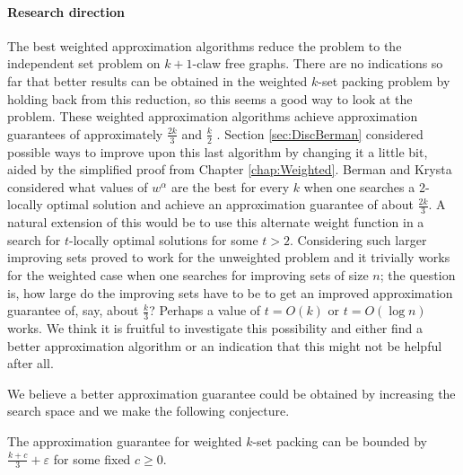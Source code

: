 \paragraph{Research direction} The best weighted approximation algorithms reduce the problem to the independent set problem on $k+1$-claw free graphs. There are no indications so far that better results can be obtained in the weighted $k$-set packing problem by holding back from this reduction, so this seems a good way to look at the problem. These weighted approximation algorithms achieve approximation guarantees of approximately $\frac{2k}{3}$ \cite{Chandra} and $\frac{k}{2}$ \cite{Berman}. Section \ref{sec:DiscBerman} considered possible ways to improve upon this last algorithm by changing it a little bit, aided by the simplified proof from Chapter \ref{chap:Weighted}. Berman and Krysta \cite{BermanWeighted2} considered what values of $w^\alpha$ are the best for every $k$ when one searches a 2-locally optimal solution and achieve an approximation guarantee of about $\frac{2k}{3}$. A natural extension of this would be to use this alternate weight function in a search for $t$-locally optimal solutions for some $t>2$. Considering such larger improving sets proved to work for the unweighted problem and it trivially works for the weighted case when one searches for improving sets of size $n$; the question is, how large do the improving sets have to be to get an improved approximation guarantee of, say, about $\frac{k}{3}$? Perhaps a value of $t = O(k)$ or $t = O(\log n)$ works. We think it is fruitful to investigate this possibility and either find a better approximation algorithm or an indication that this might not be helpful after all.

We believe a better approximation guarantee could be obtained by increasing the search space and we make the following conjecture.

\begin{conjecture}
The approximation guarantee for weighted $k$-set packing can be bounded by $\frac{k+c}{3} + \varepsilon$ for some fixed $c \geq 0$.
\end{conjecture}


